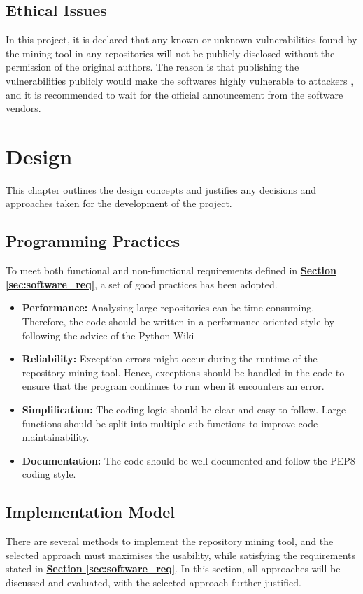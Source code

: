 \documentclass[12pt, a4paper]{report}
\begin{document}
\section{Ethical Issues}
In this project, it is declared that any known or unknown vulnerabilities found by the mining tool
in any repositories will not be publicly disclosed without the permission of the original authors.
The reason is that publishing the vulnerabilities publicly would make the softwares highly
vulnerable to attackers \cite{arora_2010}, and it is recommended to wait for the official
announcement from the software vendors.

\chapter{Design}
This chapter outlines the design concepts and justifies any decisions and approaches taken for the
development of the project.

\section{Programming Practices}
To meet both functional and non-functional requirements defined in
\hyperref[sec:software_req]{\textbf{Section \ref*{sec:software_req}}}, a set of good practices has
been adopted.
\begin{itemize}
  \item \textbf{Performance:} Analysing large repositories can be time consuming. Therefore, the
  code should be written in a performance oriented style by following the advice of the Python Wiki
  \cite{python_performance_tips}
  \item \textbf{Reliability:} Exception errors might occur during the runtime of the repository
  mining tool. Hence, exceptions should be handled in the code to ensure that the program continues
  to run when it encounters an error.
  \item \textbf{Simplification:} The coding logic should be clear and easy to follow. Large
  functions should be split into multiple sub-functions to improve code maintainability.
  \item \textbf{Documentation:} The code should be well documented and follow the PEP8 \cite{pep8}
  coding style.
\end{itemize}

\section{Implementation Model}
There are several methods to implement the repository mining tool, and the selected approach must
maximises the usability, while satisfying the requirements stated in
\hyperref[sec:software_req]{\textbf{Section \ref*{sec:software_req}}}. In this section, all
approaches will be discussed and evaluated, with the selected approach further justified.
\end{document}

